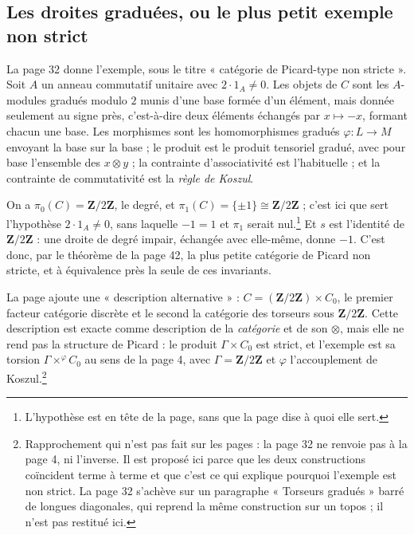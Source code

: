 \documentclass[11pt,a4paper]{article}
\begin{document}
\subsection*{Les droites graduées, ou le plus petit exemple non strict}

La page 32 donne l'exemple, sous le titre « catégorie de Picard-type non
stricte ». Soit $A$ un anneau commutatif unitaire avec $2 \cdot 1_{A} \neq 0$.
Les objets de $C$ sont les $A$-modules gradués modulo $2$ munis d'une base
formée d'un élément, mais donnée seulement au signe près, c'est-à-dire deux éléments
échangés par $x \mapsto -x$, formant chacun une base. Les morphismes sont les
homomorphismes gradués $\varphi : L \to M$ envoyant la base sur la base ; le
produit est le produit tensoriel gradué, avec pour base l'ensemble des $x
\otimes y$ ; la contrainte d'associativité est l'habituelle ; et la contrainte
de commutativité est la \emph{règle de Koszul}.

On a $\pi_{0}(C) = \mathbf{Z}/2\mathbf{Z}$, le degré, et $\pi_{1}(C) =
\{\pm 1\} \cong \mathbf{Z}/2\mathbf{Z}$ ; c'est ici que sert l'hypothèse
$2 \cdot 1_{A} \neq 0$, sans laquelle $-1 = 1$ et $\pi_{1}$ serait
nul.\footnote{L'hypothèse est en tête de la page, sans que la page dise à quoi
elle sert.} Et $s$ est l'identité de $\mathbf{Z}/2\mathbf{Z}$ : une droite de
degré impair, échangée avec elle-même, donne $-1$. C'est donc, par le théorème
de la page 42, la plus petite catégorie de Picard non stricte, et à
équivalence près la seule de ces invariants.

La page ajoute une « description alternative » : $C = (\mathbf{Z}/2\mathbf{Z})
\times C_{0}$, le premier facteur catégorie discrète et le second la catégorie
des torseurs sous $\mathbf{Z}/2\mathbf{Z}$. Cette description est exacte comme
description de la \emph{catégorie} et de son $\otimes$, mais elle ne rend pas
la structure de Picard : le produit $\Gamma \times C_{0}$ est strict, et
l'exemple est sa torsion $\Gamma \times^{\varphi} C_{0}$ au sens de la page 4,
avec $\Gamma = \mathbf{Z}/2\mathbf{Z}$ et $\varphi$ l'accouplement de
Koszul.\footnote{Rapprochement qui n'est pas fait sur les pages : la page 32
ne renvoie pas à la page 4, ni l'inverse. Il est proposé ici parce que les
deux constructions coïncident terme à terme et que c'est ce qui explique
pourquoi l'exemple est non strict. La page 32 s'achève sur un paragraphe
« Torseurs gradués » barré de longues diagonales, qui reprend la même
construction sur un topos ; il n'est pas restitué ici.}
\end{document}
